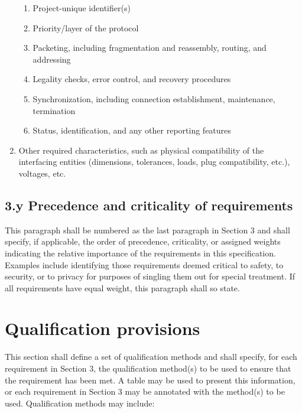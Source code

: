 \documentclass{fidata-report-template}
\begin{document}
\begin{enumerate}
  \begin{enumerate}
  \itemsep1pt\parskip0pt
  \item
    Project-unique identifier(s)
  \item
    Priority/layer of the protocol
  \item
    Packeting, including fragmentation and reassembly, routing, and
    addressing
  \item
    Legality checks, error control, and recovery procedures
  \item
    Synchronization, including connection establishment, maintenance,
    termination
  \item
    Status, identification, and any other reporting features
  \end{enumerate}
\item
  Other required characteristics, such as physical compatibility of the
  interfacing entities (dimensions, tolerances, loads, plug
  compatibility, etc.), voltages, etc.
\end{enumerate}

\subsection{3.y Precedence and criticality of requirements}

This paragraph shall be numbered as the last paragraph in Section 3 and
shall specify, if applicable, the order of precedence, criticality, or
assigned weights indicating the relative importance of the requirements
in this specification. Examples include identifying those requirements
deemed critical to safety, to security, or to privacy for purposes of
singling them out for special treatment. If all requirements have equal
weight, this paragraph shall so state.

\section{Qualification provisions}

This section shall define a set of qualification methods and shall
specify, for each requirement in Section 3, the qualification method(s)
to be used to ensure that the requirement has been met. A table may be
used to present this information, or each requirement in Section 3 may
be annotated with the method(s) to be used. Qualification methods may
include:
\end{document}
